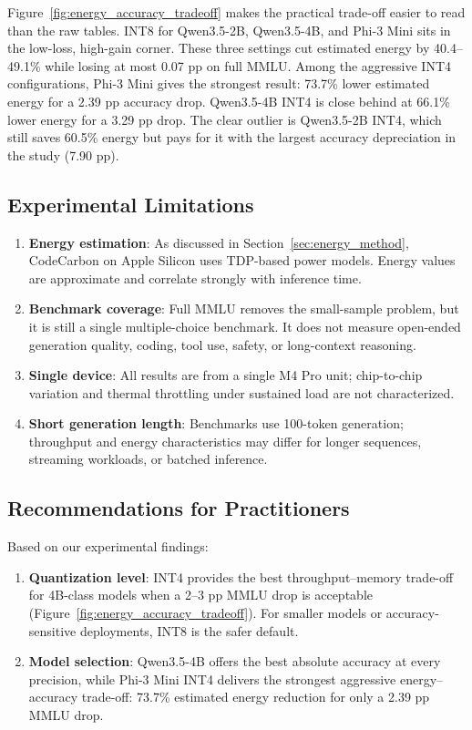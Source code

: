 \documentclass[11pt,a4paper]{article}
\begin{document}
Figure~\ref{fig:energy_accuracy_tradeoff} makes the practical trade-off easier to read than the raw tables. INT8 for Qwen3.5-2B, Qwen3.5-4B, and Phi-3 Mini sits in the low-loss, high-gain corner. These three settings cut estimated energy by 40.4--49.1\% while losing at most 0.07 pp on full MMLU. Among the aggressive INT4 configurations, Phi-3 Mini gives the strongest result: 73.7\% lower estimated energy for a 2.39 pp accuracy drop. Qwen3.5-4B INT4 is close behind at 66.1\% lower energy for a 3.29 pp drop. The clear outlier is Qwen3.5-2B INT4, which still saves 60.5\% energy but pays for it with the largest accuracy depreciation in the study (7.90 pp).

\subsection{Experimental Limitations}

\begin{enumerate}[leftmargin=*,nosep]
    \item \textbf{Energy estimation}: As discussed in Section~\ref{sec:energy_method}, CodeCarbon on Apple Silicon uses TDP-based power models. Energy values are approximate and correlate strongly with inference time.

    \item \textbf{Benchmark coverage}: Full MMLU removes the small-sample problem, but it is still a single multiple-choice benchmark. It does not measure open-ended generation quality, coding, tool use, safety, or long-context reasoning.

    \item \textbf{Single device}: All results are from a single M4 Pro unit; chip-to-chip variation and thermal throttling under sustained load are not characterized.

    \item \textbf{Short generation length}: Benchmarks use 100-token generation; throughput and energy characteristics may differ for longer sequences, streaming workloads, or batched inference.
\end{enumerate}

\subsection{Recommendations for Practitioners}

Based on our experimental findings:

\begin{enumerate}[leftmargin=*,nosep]
    \item \textbf{Quantization level}: INT4 provides the best throughput--memory trade-off for 4B-class models when a 2--3 pp MMLU drop is acceptable (Figure~\ref{fig:energy_accuracy_tradeoff}). For smaller models or accuracy-sensitive deployments, INT8 is the safer default.

    \item \textbf{Model selection}: Qwen3.5-4B offers the best absolute accuracy at every precision, while Phi-3 Mini INT4 delivers the strongest aggressive energy--accuracy trade-off: 73.7\% estimated energy reduction for only a 2.39 pp MMLU drop.
\end{enumerate}
\end{document}
